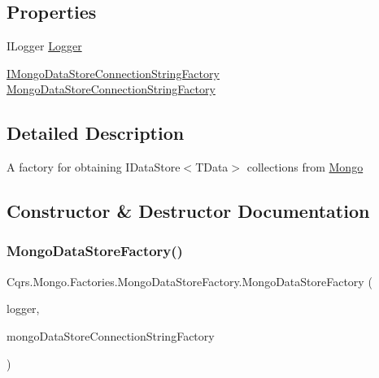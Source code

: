 \subsection*{Properties}
\begin{DoxyCompactItemize}
\item 
I\+Logger \hyperlink{classCqrs_1_1Mongo_1_1Factories_1_1MongoDataStoreFactory_a52df9c093f6c5a5666b27833334b48dc_a52df9c093f6c5a5666b27833334b48dc}{Logger}
\item 
\hyperlink{interfaceCqrs_1_1Mongo_1_1Factories_1_1IMongoDataStoreConnectionStringFactory}{I\+Mongo\+Data\+Store\+Connection\+String\+Factory} \hyperlink{classCqrs_1_1Mongo_1_1Factories_1_1MongoDataStoreFactory_a2a93f0c1223ac3eaf3228307ee2849e8_a2a93f0c1223ac3eaf3228307ee2849e8}{Mongo\+Data\+Store\+Connection\+String\+Factory}
\end{DoxyCompactItemize}


\subsection{Detailed Description}
A factory for obtaining I\+Data\+Store$<$\+T\+Data$>$ collections from \hyperlink{namespaceCqrs_1_1Mongo}{Mongo} 



\subsection{Constructor \& Destructor Documentation}
\mbox{\label{classCqrs_1_1Mongo_1_1Factories_1_1MongoDataStoreFactory_a13e1957d50ef5ebb18723a3628a0ae5d_a13e1957d50ef5ebb18723a3628a0ae5d}} 
\subsubsection{\texorpdfstring{Mongo\+Data\+Store\+Factory()}{MongoDataStoreFactory()}}
{\footnotesize\ttfamily Cqrs.\+Mongo.\+Factories.\+Mongo\+Data\+Store\+Factory.\+Mongo\+Data\+Store\+Factory (\begin{DoxyParamCaption}\item[{I\+Logger}]{logger,  }\item[{\hyperlink{interfaceCqrs_1_1Mongo_1_1Factories_1_1IMongoDataStoreConnectionStringFactory}{I\+Mongo\+Data\+Store\+Connection\+String\+Factory}}]{mongo\+Data\+Store\+Connection\+String\+Factory }\end{DoxyParamCaption})}



